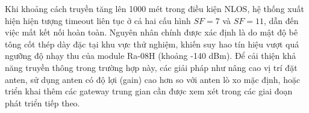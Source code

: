 Khi khoảng cách truyền tăng lên 1000 mét trong điều kiện NLOS, hệ thống xuất hiện
hiện tượng timeout liên tục ở cả hai cấu hình $SF=7$ và $SF=11$, dẫn đến việc mất
kết nối hoàn toàn. Nguyên nhân chính được xác định là do mật độ bê tông cốt thép
dày đặc tại khu vực thử nghiệm, khiến suy hao tín hiệu vượt quá ngưỡng độ nhạy thu
của module Ra-08H (khoảng -140 dBm). Để cải thiện khả năng truyền thông trong
trường hợp này, các giải pháp như nâng cao vị trí đặt anten, sử dụng anten có độ lợi
(gain) cao hơn so với anten lò xo mặc định, hoặc triển khai thêm các gateway trung
gian cần được xem xét trong các giai đoạn phát triển tiếp theo.





